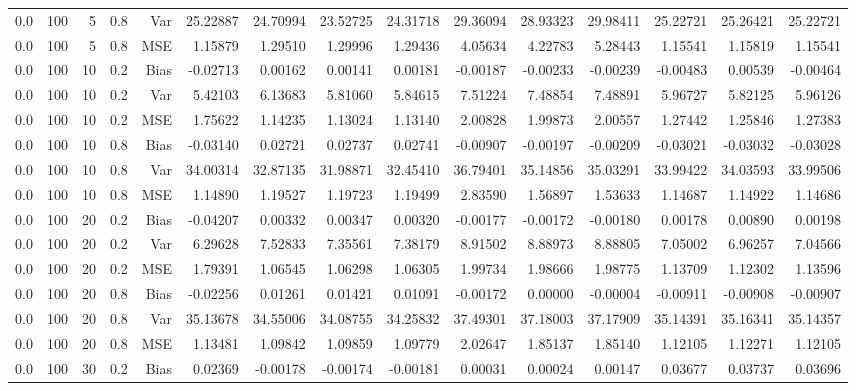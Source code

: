\begin{table}[!htbp]
\begin{tabular}{lrrrrrrrrrrrrrr}
0.0 & 100 &  5 & 0.8 & Var & 25.22887 & 24.70994 & 23.52725 & 24.31718 & 29.36094 & 28.93323 & 29.98411 & 25.22721 & 25.26421 & 25.22721 \\
0.0 & 100 &  5 & 0.8 & MSE & 1.15879 & 1.29510 & 1.29996 & 1.29436 & 4.05634 & 4.22783 & 5.28443 & 1.15541 & 1.15819 & 1.15541 \\
0.0 & 100 & 10 & 0.2 & Bias & -0.02713 & 0.00162 & 0.00141 & 0.00181 & -0.00187 & -0.00233 & -0.00239 & -0.00483 & 0.00539 & -0.00464 \\
0.0 & 100 & 10 & 0.2 & Var & 5.42103 & 6.13683 & 5.81060 & 5.84615 & 7.51224 & 7.48854 & 7.48891 & 5.96727 & 5.82125 & 5.96126 \\
0.0 & 100 & 10 & 0.2 & MSE & 1.75622 & 1.14235 & 1.13024 & 1.13140 & 2.00828 & 1.99873 & 2.00557 & 1.27442 & 1.25846 & 1.27383 \\
0.0 & 100 & 10 & 0.8 & Bias & -0.03140 & 0.02721 & 0.02737 & 0.02741 & -0.00907 & -0.00197 & -0.00209 & -0.03021 & -0.03032 & -0.03028 \\
0.0 & 100 & 10 & 0.8 & Var & 34.00314 & 32.87135 & 31.98871 & 32.45410 & 36.79401 & 35.14856 & 35.03291 & 33.99422 & 34.03593 & 33.99506 \\
0.0 & 100 & 10 & 0.8 & MSE & 1.14890 & 1.19527 & 1.19723 & 1.19499 & 2.83590 & 1.56897 & 1.53633 & 1.14687 & 1.14922 & 1.14686 \\
0.0 & 100 & 20 & 0.2 & Bias & -0.04207 & 0.00332 & 0.00347 & 0.00320 & -0.00177 & -0.00172 & -0.00180 & 0.00178 & 0.00890 & 0.00198 \\
0.0 & 100 & 20 & 0.2 & Var & 6.29628 & 7.52833 & 7.35561 & 7.38179 & 8.91502 & 8.88973 & 8.88805 & 7.05002 & 6.96257 & 7.04566 \\
0.0 & 100 & 20 & 0.2 & MSE & 1.79391 & 1.06545 & 1.06298 & 1.06305 & 1.99734 & 1.98666 & 1.98775 & 1.13709 & 1.12302 & 1.13596 \\
0.0 & 100 & 20 & 0.8 & Bias & -0.02256 & 0.01261 & 0.01421 & 0.01091 & -0.00172 & 0.00000 & -0.00004 & -0.00911 & -0.00908 & -0.00907 \\
0.0 & 100 & 20 & 0.8 & Var & 35.13678 & 34.55006 & 34.08755 & 34.25832 & 37.49301 & 37.18003 & 37.17909 & 35.14391 & 35.16341 & 35.14357 \\
0.0 & 100 & 20 & 0.8 & MSE & 1.13481 & 1.09842 & 1.09859 & 1.09779 & 2.02647 & 1.85137 & 1.85140 & 1.12105 & 1.12271 & 1.12105 \\
0.0 & 100 & 30 & 0.2 & Bias & 0.02369 & -0.00178 & -0.00174 & -0.00181 & 0.00031 & 0.00024 & 0.00147 & 0.03677 & 0.03737 & 0.03696 \\

\end{tabular}
\end{table}
